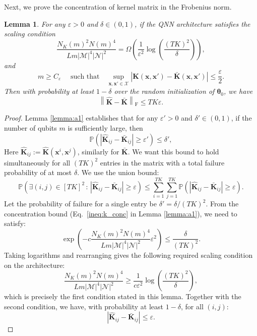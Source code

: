\documentclass[pdflatex,sn-mathphys-num]{sn-jnl}%
\theoremstyle{thmstyleone}%
\theoremstyle{thmstyletwo}%
\theoremstyle{thmstylethree}%
\newtheorem{lemma}{Lemma}[section]
\newcommand{\norm}[1]{\left\lVert#1\right\rVert}
\newcommand{\abs}[1]{\left\vert#1\right\vert}
\newcommand{\bigOmega}{\Omega}
\newcommand{\xbf}{\mathbf{x}}
\newcommand{\Kbf}{\mathbf{K}}
\newcommand{\thetabf}{\bm{\theta}}
\begin{document}
\begin{appendices}
\noindent Next, we prove the concentration of kernel matrix in the Frobenius norm. 

\begin{lemma} \label{lemma:conc_mtx_error}
For any $\varepsilon > 0$ and $\delta \in (0, 1)$, if the QNN architecture satisfies the scaling condition
$$ \frac{N_K(m)^2 N(m)^4}{Lm |\mathcal{M}|^4 |\mathcal{N}|^2} = \bigOmega\left( \frac{1}{\varepsilon^2}\log\left(\frac{(TK)^2}{\delta}\right) \right), $$
and $$m \geq C_{\varepsilon}\quad  \text{ such that}\quad  \sup_{\xbf,\xbf' \in \mathcal{X}} \abs{\Kbf(\xbf, \xbf') - \bar{\Kbf}(\xbf, \xbf')} \leq \frac{\varepsilon }{ 2}.$$
Then with probability at least $1-\delta$ over the random initialization of ${\thetabf}_0$, we have
$$ \norm{\hat{\mathbf{K}} - \bar{\mathbf{K}}}_{\mathrm{F}} \le TK\varepsilon. $$
\end{lemma}


\begin{proof}
Lemma \ref{lemma:a1} establishes that for any $\varepsilon' > 0$ and $\delta' \in (0, 1)$, if the number of qubits $m$ is sufficiently large, then
$$ \mathbb{P}\left(\abs{\hat{\mathbf{K}}_{ij} - \bar{\mathbf{K}}_{ij}} \ge \varepsilon'\right) \le \delta',$$
Here $\hat{\Kbf}_{i j}:=\hat{\Kbf}(\xbf^i,\xbf^j)$, similarly for $\bar{\Kbf}$. We want this bound to hold simultaneously for all $(TK)^2$ entries in the matrix with a total failure probability of at most $\delta$. We use the union bound: %
$$ \mathbb{P}\left(\exists (i,j) \in [TK]^2  \,:\,\abs{\hat{\mathbf{K}}_{ij} - \bar{\mathbf{K}}_{ij}} \ge \varepsilon\right) \le \sum_{i=1}^{TK}\sum_{ j=1}^{TK} \mathbb{P}\left(\abs{\hat{\mathbf{K}}_{ij} - \bar{\mathbf{K}}_{ij}} \ge \varepsilon\right). $$
Let the probability of failure for a single entry be $\delta' = \delta / (TK)^2$. From the   concentration bound (Eq.~\eqref{ineq:k_conc} in Lemma \ref{lemma:a1}), we need to satisfy:
$$ \exp \left( -c \frac{N_K(m)^2 N(m)^4}{Lm |\mathcal{M}|^4 |\mathcal{N}|^2} \varepsilon^2 \right) \le \frac{\delta}{(TK)^2}. $$
Taking logarithms and rearranging gives the following required scaling condition on the architecture:
$$ \frac{N_K(m)^2 N(m)^4}{Lm |\mathcal{M}|^4 |\mathcal{N}|^2} \ge \frac{1}{c\varepsilon^2} \log\left(\frac{(TK)^2}{\delta}\right),$$
which is precisely the first condition stated in this lemma. Together with the second condition, we have, with probability at least $1-\delta$, for all $(i,j)$:
$$ \abs{\hat{\mathbf{K}}_{ij} - \bar{\mathbf{K}}_{ij}} \le \varepsilon. $$


\end{proof}
\end{appendices}
\end{document}
